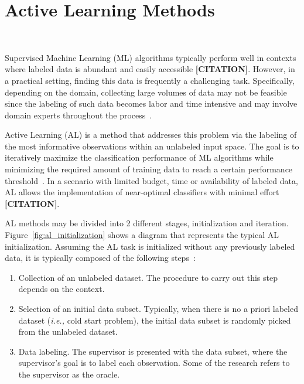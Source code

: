 \documentclass[parskip=full]{scrartcl}
\begin{document}
\section{Active Learning Methods}~\label{sec:active_learning_methods}

Supervised Machine Learning (ML) algorithms typically perform well in contexts
where labeled data is abundant and easily accessible \textbf{[CITATION]}.
However, in a practical setting, finding this data is frequently a challenging
task. Specifically, depending on the domain, collecting large volumes of data
may not be feasible since the labeling of such data becomes labor and time
intensive and may involve domain experts throughout the
process~\cite{Cao2020}.

Active Learning (AL) is a method that addresses this problem via the labeling
of the most informative observations within an unlabeled input space. The goal
is to iteratively maximize the classification performance of ML algorithms
while minimizing the required amount of training data to reach a certain
performance threshold~\cite{Shrivastava2021}. In a scenario with limited
budget, time or availability of labeled data, AL allows the implementation of
near-optimal classifiers with minimal effort \textbf{[CITATION]}.

AL methods may be divided into 2 different stages, initialization and
iteration. Figure~\ref{fig:al_initialization} shows a diagram that represents
the typical AL initialization. Assuming the AL task is initialized without any
previously labeled data, it is typically composed of the following
steps~\cite{Fonseca2021}:

\begin{enumerate}

    \item Collection of an unlabeled dataset. The procedure to carry out
        this step depends on the context.

    \item Selection of an initial data subset. Typically, when there is no a
        priori labeled dataset (\textit{i.e.,} cold start problem), the
        initial data subset is randomly picked from the unlabeled dataset.

    \item Data labeling. The supervisor is presented with the data
        subset, where the supervisor's goal is to label each observation. Some
        of the research refers to the supervisor as the oracle.

\end{enumerate}
\end{document}
